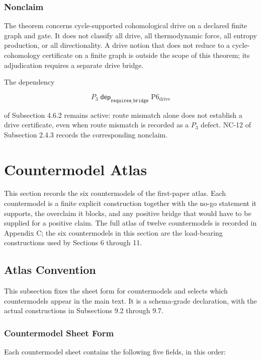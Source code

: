 \documentclass[11pt]{article}
\theoremstyle{definition}
\begin{document}
\subsubsection{Nonclaim}

The theorem concerns cycle-supported cohomological drive on a declared finite graph and gate. It does not classify all drive, all thermodynamic force, all entropy production, or all directionality. A drive notion that does not reduce to a cycle-cohomology certificate on a finite graph is outside the scope of this theorem; its adjudication requires a separate drive bridge.

The dependency

\[
P_3\;\mathrel{\mathsf{dep}_{\texttt{requires\_bridge}}}\;\mathrm{P6}_{\mathrm{drive}}
\]

of Subsection 4.6.2 remains active: route mismatch alone does not establish a drive certificate, even when route mismatch is recorded as a \(P_3\) defect. NC-12 of Subsection 2.4.3 records the corresponding nonclaim.
 \section{Countermodel Atlas}

This section records the six countermodels of the first-paper atlas. Each countermodel is a finite explicit construction together with the no-go statement it supports, the overclaim it blocks, and any positive bridge that would have to be supplied for a positive claim. The full atlas of twelve countermodels is recorded in Appendix C; the six countermodels in this section are the load-bearing constructions used by Sections 6 through 11.

\subsection{Atlas Convention}

This subsection fixes the sheet form for countermodels and selects which countermodels appear in the main text. It is a schema-grade declaration, with the actual constructions in Subsections 9.2 through 9.7.

\subsubsection{Countermodel Sheet Form}

Each countermodel sheet contains the following five fields, in this order:
\end{document}
